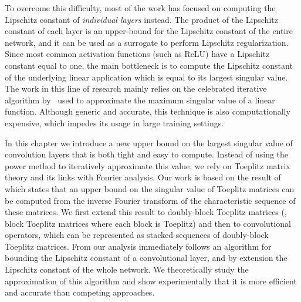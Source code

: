 To overcome this difficulty, most of the work has focused on computing the Lipschitz constant of \emph{individual layers} instead.
The product of the Lipschitz constant of each layer is an upper-bound for the Lipschitz constant of the entire network, and it can be used as a surrogate to perform Lipschitz regularization.
Since most common activation functions (such as ReLU) have a Lipschitz constant equal to one, the main bottleneck is to compute the Lipschitz constant of the underlying linear application which is equal to its largest singular value.
The work in this line of research mainly relies on the celebrated iterative algorithm by~\citet{golub2000eigenvalue} used to approximate the maximum singular value of a linear function.
Although generic and accurate, this technique is also computationally expensive, which impedes its usage in large training settings.

In this chapter we introduce a new upper bound on the largest singular value of convolution layers that is both tight and easy to compute.
Instead of using the power method to iteratively approximate this value, we rely on Toeplitz matrix theory and its links with Fourier analysis.
Our work is based on the result of~\citet{gray2006toeplitz} which states that an upper bound on the singular value of Toeplitz matrices can be computed from the inverse Fourier transform of the characteristic sequence of these matrices.
We first extend this result to doubly-block Toeplitz matrices (\ie, block Toeplitz matrices where each block is Toeplitz) and then to convolutional operators, which can be represented as stacked sequences of doubly-block Toeplitz matrices.
From our analysis immediately follows an algorithm for bounding the Lipschitz constant of a convolutional layer, and by extension the Lipschitz constant of the whole network.
We theoretically study the approximation of this algorithm and show experimentally that it is more efficient and accurate than competing approaches.

